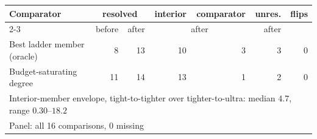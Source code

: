 \begin{tabular}{lrrrrrr}
\toprule
Comparator & \multicolumn{2}{c}{resolved} & interior & comparator & unres. & flips \\
\cmidrule(lr){2-3}
 & before & after & \multicolumn{2}{c}{after} & after & \\
\midrule
Best ladder member (oracle) & 8 & 13 & 10 & 3 & 3 & 0 \\
Budget-saturating degree & 11 & 14 & 13 & 1 & 2 & 0 \\
\midrule
\multicolumn{7}{l}{\footnotesize Interior-member envelope, tight-to-tighter over tighter-to-ultra: median $4.7$, range $0.30$--$18.2$} \\
\multicolumn{7}{l}{\footnotesize Panel: all 16 comparisons, 0 missing} \\
\bottomrule
\end{tabular}
